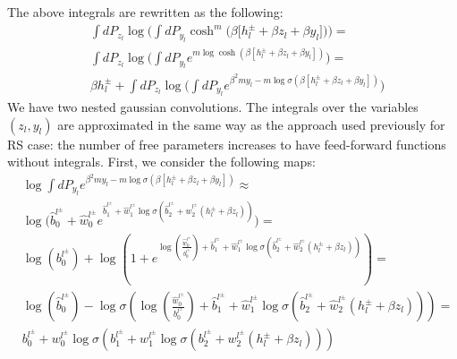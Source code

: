 \documentclass[10pt, notitlepage]{revtex4-2}
\begin{document}
The above integrals are rewritten as the following:
\begin{align}
& \int dP_{z_l} \log \bigg( \int dP_{y_{l}}  \cosh^m\bigg(\beta \big[h_l^{\pm}+\beta z_l + \beta  y_{l}\big]  \bigg)  \bigg) 
 = \\
& \int dP_{z_l} \log \biggl( \int dP_{y_{l}} e^{ m \log \cosh \left(\beta \left[h_l^{\pm}+ \beta  z_l + \beta  y_{l}\right]  \right) } \biggr) 
 = \\
& \beta h_{l}^{\pm} + \int dP_{z_l} \log \biggl( \int dP_{y_{l}} e^{\beta^2 m y_{l} - m \log \sigma \left(\beta \left[h_l^{\pm}+ \beta z_l +\beta y_{l}\right]  \right) } \biggr) 
\end{align}
We have two nested gaussian convolutions.
The integrals over the variables $(z_l, y_l)$ are approximated in the same way as the approach used previously for RS case: the number of free parameters increases to have feed-forward functions without integrals. First, we consider the following maps:
\begin{align}
    & \log \int dP_{y_{l}} e^{ \beta^2 m y_{l} - m \log \sigma \left(\beta \left[h_l^{\pm}+\beta z_l +\beta y_{l}\right]  \right) }  \approx\\
    & \log \bigg( \hat{b}_0^{l^{\pm}} + \hat{w}_0^{l^{\pm}} e^{\hat{b}_1^{l^{\pm}} + \hat{w}_1^{l^{\pm}} \log \sigma (\hat{b}_2^{l^{\pm}} + \hat{w}_2^{l^{\pm}} (h_l^{\pm}+ \beta  z_l))} \bigg) = \\
    & \log(b_0^{l^{\pm}}) + \log(1 + e^{ \log( \frac{\hat{w}_0^{l^{\pm}}}{b_0^{l^{\pm}}} ) + \hat{b}_1^{l^{\pm}} + \hat{w}_1^{l^{\pm}} \log \sigma (\hat{b}_2^{l^{\pm}} + \hat{w}_2^{l^{\pm}} (h_l^{\pm}+ \beta  z_l))})=\\
    & \log(\hat{b}_0^{l^{\pm}}) - \log\sigma( \log( \frac{\hat{w}_0^{l^{\pm}}}{b_0^{l^{\pm}}} ) + \hat{b}_1^{l^{\pm}} + \hat{w}_1^{l^{\pm}} \log \sigma (\hat{b}_2^{l^{\pm}} + \hat{w}_2^{l^{\pm}} (h_l^{\pm}+ \beta  z_l)))=\\
    & b_0^{l^{\pm}} + w_0^{l^{\pm}} \log\sigma(b_1^{l^{\pm}} + w_1^{l^{\pm}} \log \sigma (b_2^{l^{\pm}} + w_2^{l^{\pm}} (h_l^{\pm}+ \beta  z_l)))
\end{align}
\end{document}
